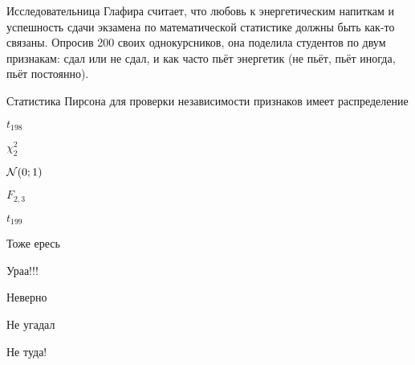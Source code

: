 
\begin{question}
Исследовательница Глафира считает, что любовь к энергетическим напиткам
и успешность сдачи экзамена по математической статистике должны быть
как-то связаны. Опросив 200 своих однокурсников, она поделила студентов
по двум признакам: сдал или не сдал, и как часто пьёт энергетик (не
пьёт, пьёт иногда, пьёт постоянно).

Статистика Пирсона для проверки независимости признаков имеет
распределение
\begin{answerlist}
  \item \(t_{198}\)
  \item \(\chi^2_2\)
  \item \(\mathcal{N}(0;1)\)
  \item \(F_{2,3}\)
  \item \(t_{199}\)
\end{answerlist}
\end{question}

\begin{solution}
\begin{answerlist}
  \item Тоже ересь
  \item Ураа!!!
  \item Неверно
  \item Не угадал
  \item Не туда!
\end{answerlist}
\end{solution}

